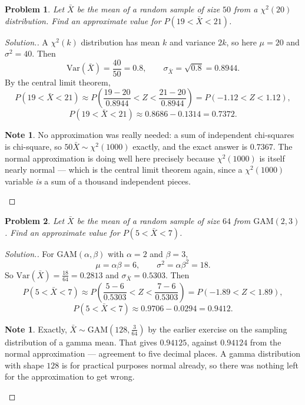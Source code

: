 \documentclass[12pt,a4paper]{report}
\theoremstyle{definition}
\newtheorem{note}[thm]{Note}
\theoremstyle{plain}
\newtheorem{problemx}{Problem}[section]
\newenvironment{problem}{\begin{problemx}}{\end{problemx}}
\newenvironment{solution}
  {\renewcommand{\qedsymbol}{}\begin{proof}[\textit{Solution}.]}
  {\end{proof}}
\begin{document}
\begin{problem}
Let $\bar X$ be the mean of a random sample of size $50$ from a $\chi^2(20)$
distribution. Find an approximate value for $P\left(19<\bar X<21\right)$.
\end{problem}

\begin{solution}
A $\chi^2(k)$ distribution has mean $k$ and variance $2k$, so here
$\mu=20$ and $\sigma^2=40$. Then
\[\text{Var}\left(\bar X\right)=\frac{40}{50}=0.8,\qquad
\sigma_{\bar X}=\sqrt{0.8}=0.8944.\]
By the central limit theorem,
\[P\left(19<\bar X<21\right)
\approx P\!\left(\frac{19-20}{0.8944}<Z<\frac{21-20}{0.8944}\right)
=P(-1.12<Z<1.12),\]
\[P\left(19<\bar X<21\right)\approx0.8686-0.1314=0.7372.\]

\begin{note}
No approximation was really needed: a sum of independent chi-squares is chi-square,
so $50\bar X\sim\chi^2(1000)$ exactly, and the exact answer is $0.7367$. The normal
approximation is doing well here precisely because $\chi^2(1000)$ is itself nearly
normal --- which is the central limit theorem again, since a $\chi^2(1000)$ variable
\emph{is} a sum of a thousand independent pieces.
\end{note}
\end{solution}

\begin{problem}
Let $\bar X$ be the mean of a random sample of size $64$ from
$\text{GAM}(2,3)$. Find an approximate value for $P\left(5<\bar X<7\right)$.
\end{problem}

\begin{solution}
For $\text{GAM}(\alpha,\beta)$ with $\alpha=2$ and $\beta=3$,
\[\mu=\alpha\beta=6,\qquad\sigma^2=\alpha\beta^2=18.\]
So $\text{Var}\left(\bar X\right)=\frac{18}{64}=0.2813$ and
$\sigma_{\bar X}=0.5303$. Then
\[P\left(5<\bar X<7\right)
\approx P\!\left(\frac{5-6}{0.5303}<Z<\frac{7-6}{0.5303}\right)
=P(-1.89<Z<1.89),\]
\[P\left(5<\bar X<7\right)\approx0.9706-0.0294=0.9412.\]

\begin{note}
Exactly, $\bar X\sim\text{GAM}\!\left(128,\frac{3}{64}\right)$ by the earlier
exercise on the sampling distribution of a gamma mean. That gives $0.94125$,
against $0.94124$ from the normal approximation --- agreement to five decimal
places. A gamma distribution with shape $128$ is for practical purposes normal
already, so there was nothing left for the approximation to get wrong.
\end{note}
\end{solution}
\end{document}
